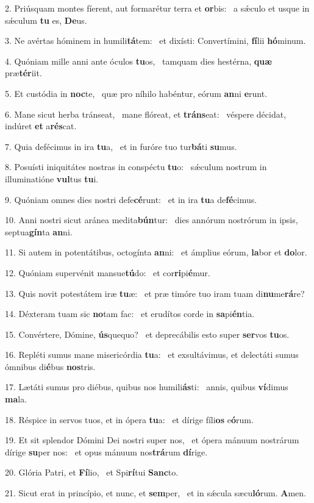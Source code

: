 2. Priúsquam montes fíerent, aut formarétur terra et \textbf{or}bis: \ast\  a sǽculo et usque in sǽculum \textbf{tu} es, \textbf{De}us.\

3. Ne avértas hóminem in humili\textbf{tá}tem: \ast\  et dixísti: Convertímini, \textbf{fí}lii \textbf{hó}minum.\

4. Quóniam mille anni ante óculos \textbf{tu}os, \ast\  tamquam dies hestérna, \textbf{quæ} præ\textbf{tér}iit.\

5. Et custódia in \textbf{noc}te, \ast\  quæ pro níhilo habéntur, eórum \textbf{an}ni \textbf{e}runt.\

6. Mane sicut herba tránseat, \dag\  mane flóreat, et \textbf{tráns}eat: \ast\  véspere décidat, indúret \textbf{et} a\textbf{rés}cat.\

7. Quia defécimus in ira \textbf{tu}a, \ast\  et in furóre tuo tur\textbf{bá}ti \textbf{su}mus.\

8. Posuísti iniquitátes nostras in conspéctu \textbf{tu}o: \ast\  sǽculum nostrum in illuminatióne \textbf{vul}tus \textbf{tu}i.\

9. Quóniam omnes dies nostri defe\textbf{cé}runt: \ast\  et in ira \textbf{tu}a de\textbf{fé}cimus.\

10. Anni nostri sicut aránea medita\textbf{bún}tur: \ast\  dies annórum nostrórum in ipsis, septua\textbf{gín}ta \textbf{an}ni.\

11. Si autem in potentátibus, octogínta \textbf{an}ni: \ast\  et ámplius eórum, \textbf{la}bor et \textbf{do}lor.\

12. Quóniam supervénit mansue\textbf{tú}do: \ast\  et cor\textbf{ri}pi\textbf{é}mur.\

13. Quis novit potestátem iræ \textbf{tu}æ: \ast\  et præ timóre tuo iram tuam di\textbf{nu}me\textbf{rá}re?\

14. Déxteram tuam sic \textbf{no}tam fac: \ast\  et erudítos corde in \textbf{sa}pi\textbf{én}tia.\

15. Convértere, Dómine, \textbf{ús}quequo? \ast\  et deprecábilis esto super \textbf{ser}vos \textbf{tu}os.\

16. Repléti sumus mane misericórdia \textbf{tu}a: \ast\  et exsultávimus, et delectáti sumus ómnibus di\textbf{é}bus \textbf{nos}tris.\

17. Lætáti sumus pro diébus, quibus nos humili\textbf{ás}ti: \ast\  annis, quibus \textbf{ví}dimus \textbf{ma}la.\

18. Réspice in servos tuos, et in ópera \textbf{tu}a: \ast\  et dírige fíli\textbf{os} e\textbf{ó}rum.\

19. Et sit splendor Dómini Dei nostri super nos, \dag\  et ópera mánuum nostrárum dírige \textbf{su}per nos: \ast\  et opus mánuum nos\textbf{trá}rum \textbf{dí}rige.\

20. Glória Patri, et \textbf{Fí}lio, \ast\  et Spi\textbf{rí}tui \textbf{Sanc}to.\

21. Sicut erat in princípio, et nunc, et \textbf{sem}per, \ast\  et in sǽcula sæcu\textbf{ló}rum. \textbf{A}men.\

